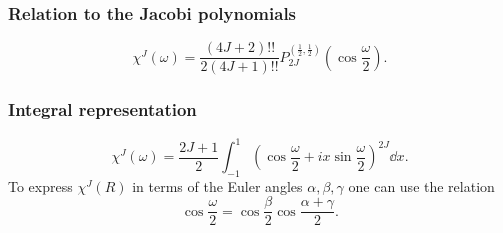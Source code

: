 \subsubsection{ Relation to the Jacobi polynomials}
\begin{equation}
\chi^{J}(\omega)=\frac{(4 J+2)!!}{2(4 J+1)!!} P_{2 J}^{\left(\frac{1}{2}, \frac{1}{2}\right)}\left(\cos \frac{\omega}{2}\right). \label{eq:4:14:13}
\end{equation}
\subsubsection{Integral representation}
\begin{equation}
\chi^{J}(\omega)=\frac{2 J+1}{2} \int_{-1}^{1}\left(\cos \frac{\omega}{2}+i x \sin \frac{\omega}{2}\right)^{2 J} \dd x .\label{eq:4:14:14}
\end{equation}
To express $\chi^{J}(R)$ in terms of the Euler angles $\alpha, \beta, \gamma$ one can use the relation
\begin{equation}
\cos \frac{\omega}{2}=\cos \frac{\beta}{2} \cos \frac{\alpha+\gamma}{2} . \label{eq:4:14:15}
\end{equation}

